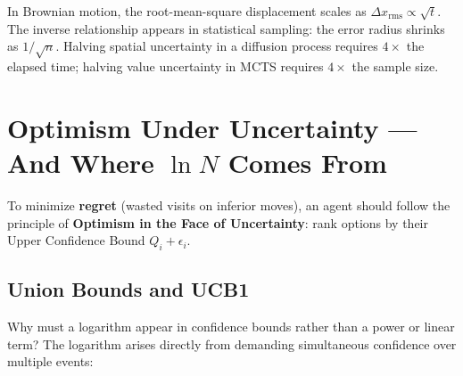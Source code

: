 \begin{bridge}
In Brownian motion, the root-mean-square displacement scales as $\Delta x_{\text{rms}} \propto \sqrt{t}$. The inverse relationship appears in statistical sampling: the error radius shrinks as $1/\sqrt{n}$. Halving spatial uncertainty in a diffusion process requires $4\times$ the elapsed time; halving value uncertainty in MCTS requires $4\times$ the sample size.
\end{bridge}

\section{Optimism Under Uncertainty — And Where $\ln N$ Comes From}
\label{sec:0_6}

To minimize \textbf{regret} (wasted visits on inferior moves), an agent should follow the principle of \textbf{Optimism in the Face of Uncertainty}: rank options by their Upper Confidence Bound $Q_i + \epsilon_i$.

\subsection{Union Bounds and UCB1}

Why must a logarithm appear in confidence bounds rather than a power or linear term? The logarithm arises directly from demanding simultaneous confidence over multiple events:

